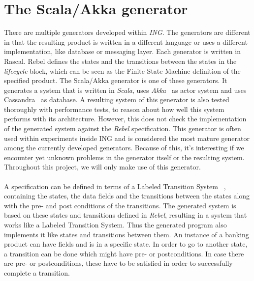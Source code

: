 \section{The Scala/Akka generator}
There are multiple generators developed within \textit{ING}. The generators are different in that the resulting product is written in a different language or uses a different implementation, like database or messaging layer. Each generator is written in Rascal. Rebel defines the states and the transitions between the states in the \textit{lifecycle} block, which can be seen as the Finite State Machine definition of the specified product. The Scala/Akka generator is one of these generators. It generates a system that is written in \textit{Scala}, uses \textit{Akka}~\cite{siteAkka2017} as actor system and uses Cassandra~\cite{siteCassandra2016} as database. A resulting system of this generator is also tested thoroughly with performance tests, to reason about how well this system performs with its architecture. However, this does not check the implementation of the generated system against the \textit{Rebel} specification. This generator is often used within experiments inside ING and is considered the most mature generator among the currently developed generators. Because of this, it's interesting if we encounter yet unknown problems in the generator itself or the resulting system. Throughout this project, we will only make use of this generator.\\
\\
A specification can be defined in terms of a Labeled Transition System~\cite{stoel2016solving}%
, containing the states, the data fields and the transitions between the states along with the pre- and post conditions of the transitions. The generated system is based on these states and transitions defined in \textit{Rebel}, resulting in a system that works like a Labeled Transition System. Thus the generated program also implements it like states and transitions between them. An instance of a banking product can have fields and is in a specific state. In order to go to another state, a transition can be done which might have pre- or postconditions. In case there are pre- or postconditions, these have to be satisfied in order to successfully complete a transition.\\
